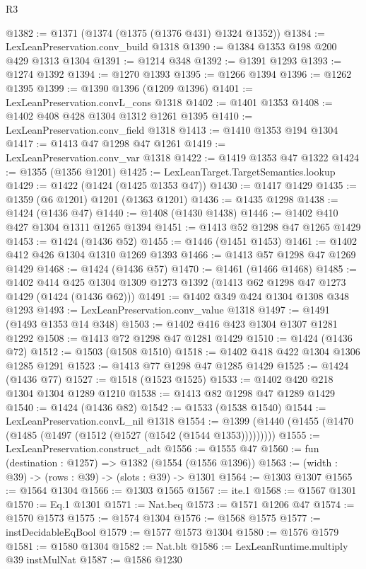 \begin{lexlean}{R3}
\begin{coremodule}
@1382 := @1371 (@1374 (@1375 (@1376 @431) @1324 @1352))
@1384 := LexLeanPreservation.conv_build @1318
@1390 := @1384 @1353 @198 @200 @429 @1313 @1304
@1391 := @1214 @348
@1392 := @1391 @1293
@1393 := @1274 @1392
@1394 := @1270 @1393
@1395 := @1266 @1394
@1396 := @1262 @1395
@1399 := @1390 @1396 (@1209 @1396)
@1401 := LexLeanPreservation.convL_cons @1318
@1402 := @1401 @1353
@1408 := @1402 @408 @428 @1304 @1312 @1261 @1395
@1410 := LexLeanPreservation.conv_field @1318
@1413 := @1410 @1353 @194 @1304
@1417 := @1413 @47 @1298 @47 @1261
@1419 := LexLeanPreservation.conv_var @1318
@1422 := @1419 @1353 @47 @1322
@1424 := @1355 (@1356 @1201)
@1425 := LexLeanTarget.TargetSemantics.lookup
@1429 := @1422 (@1424 (@1425 @1353 @47))
@1430 := @1417 @1429
@1435 := @1359 (@6 @1201) @1201 (@1363 @1201)
@1436 := @1435 @1298
@1438 := @1424 (@1436 @47)
@1440 := @1408 (@1430 @1438)
@1446 := @1402 @410 @427 @1304 @1311 @1265 @1394
@1451 := @1413 @52 @1298 @47 @1265 @1429
@1453 := @1424 (@1436 @52)
@1455 := @1446 (@1451 @1453)
@1461 := @1402 @412 @426 @1304 @1310 @1269 @1393
@1466 := @1413 @57 @1298 @47 @1269 @1429
@1468 := @1424 (@1436 @57)
@1470 := @1461 (@1466 @1468)
@1485 := @1402
    @414
    @425
    @1304
    @1309
    @1273
    @1392
    (@1413 @62 @1298 @47 @1273 @1429 (@1424 (@1436 @62)))
@1491 := @1402 @349 @424 @1304 @1308 @348 @1293
@1493 := LexLeanPreservation.conv_value @1318
@1497 := @1491 (@1493 @1353 @14 @348)
@1503 := @1402 @416 @423 @1304 @1307 @1281 @1292
@1508 := @1413 @72 @1298 @47 @1281 @1429
@1510 := @1424 (@1436 @72)
@1512 := @1503 (@1508 @1510)
@1518 := @1402 @418 @422 @1304 @1306 @1285 @1291
@1523 := @1413 @77 @1298 @47 @1285 @1429
@1525 := @1424 (@1436 @77)
@1527 := @1518 (@1523 @1525)
@1533 := @1402 @420 @218 @1304 @1304 @1289 @1210
@1538 := @1413 @82 @1298 @47 @1289 @1429
@1540 := @1424 (@1436 @82)
@1542 := @1533 (@1538 @1540)
@1544 := LexLeanPreservation.convL_nil @1318
@1554 := @1399 (@1440 (@1455 (@1470 (@1485 (@1497 (@1512 (@1527 (@1542 (@1544 @1353)))))))))
@1555 := LexLeanPreservation.construct_adt
@1556 := @1555 @47
@1560 := fun (destination : @1257) => @1382 (@1554 (@1556 @1396))
@1563 := (width : @39) -> (rows : @39) -> (slots : @39) -> @1301
@1564 := @1303 @1307
@1565 := @1564 @1304
@1566 := @1303 @1565
@1567 := ite.{1}
@1568 := @1567 @1301
@1570 := Eq.{1} @1301
@1571 := Nat.beq
@1573 := @1571 @1206 @47
@1574 := @1570 @1573
@1575 := @1574 @1304
@1576 := @1568 @1575
@1577 := instDecidableEqBool
@1579 := @1577 @1573 @1304
@1580 := @1576 @1579
@1581 := @1580 @1304
@1582 := Nat.blt
@1586 := LexLeanRuntime.multiply @39 instMulNat
@1587 := @1586 @1230

\end{coremodule}
\end{lexlean}
